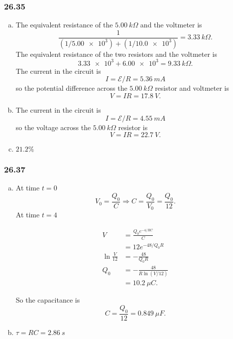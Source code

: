 \documentclass{article}
\begin{document}
\subsubsection{26.35}

\begin{enumerate}[(a)]
  \item The equivalent resistance of the $\qty{5.00}{k \Omega}$ and the voltmeter is \[\frac{1}{(1 / \num{5.00e3}) + (1 / \num{10.0e3})} = \qty{3.33}{k \Omega}.\] The equivalent resistance of the two resistors and the voltmeter is \[\num{3.33e3} + \num{6.00e3} = \qty{9.33}{k \Omega}.\] The current in the circuit is \[I = \mathcal{E} / R = \qty{5.36}{mA}\] so the potential difference across the $\qty{5.00}{k \Omega}$ resistor and voltmeter is \[V = I R = \qty{17.8}{V}.\]

  \item The current in the circuit is \[I = \mathcal{E} / R = \qty{4.55}{mA}\] so the voltage across the $\qty{5.00}{k \Omega}$ resistor is \[V = I R = \qty{22.7}{V}.\]

  \item $21.2\%$
\end{enumerate}

\subsubsection{26.37}

\begin{enumerate}[(a)]
  \item At time $t = 0$ \[V_0 = \frac{Q_0}{C} \Rightarrow C = \frac{Q_0}{V_0} = \frac{Q_0}{12}.\] At time $t = 4$

        \begin{align*}
          V                & = \frac{Q_0 e^{-4 / R C}}{C} \\
                           & = 12 e^{-48 / Q_0 R}         \\
          \ln \frac{V}{12} & = -\frac{48}{Q_0 R}          \\
          Q_0              & = -\frac{48}{R \ln (V / 12)} \\
                           & = \qty{10.2}{\mu C}.
        \end{align*}

        So the capacitance is \[C = \frac{Q_0}{12} = \qty{0.849}{\mu F}.\]

  \item $\tau = R C = \qty{2.86}{s}$
\end{enumerate}
\end{document}
